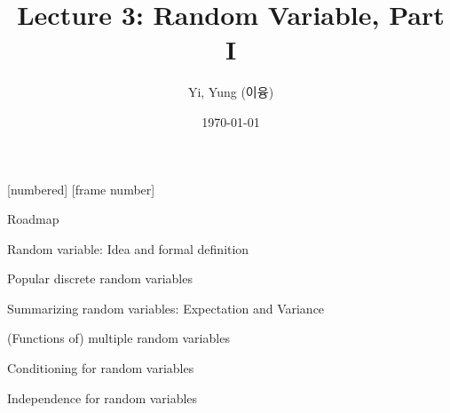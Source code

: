 

\csname\pdfmode\endcsname

{
  [numbered]
  [frame number]  %
} 




\title[]{Lecture 3: Random Variable, Part I}
\author{Yi, Yung (이융)}
\date{\today}









\begin{frame}
  \titlepage
\end{frame}



\begin{frame}{Roadmap}

\plitemsep 0.1in

\bce[(1)]

\item Random variable: Idea and formal definition

\item Popular discrete random variables

\item Summarizing random variables: Expectation and Variance

\item (Functions of) multiple random variables 

\item Conditioning for random variables

\item Independence for random variables 

\ece 

\end{frame}

